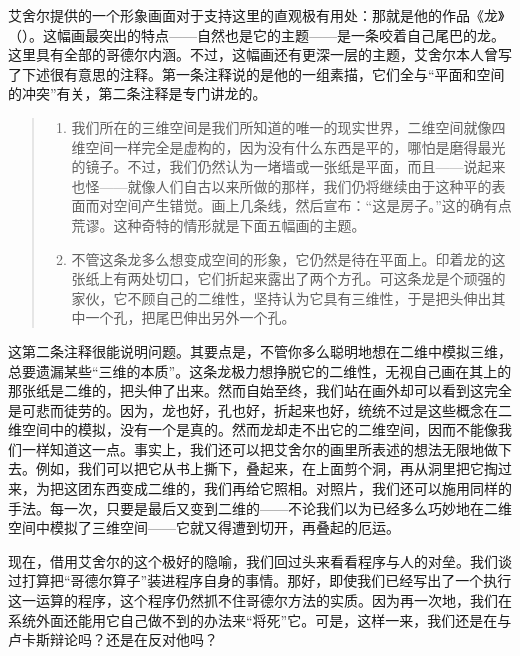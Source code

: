 艾舍尔提供的一个形象画面对于支持这里的直观极有用处：那就是他的作品《龙》（）。这幅画最突出的特点——自然也是它的主题——是一条咬着自己尾巴的龙。这里具有全部的哥德尔内涵。不过，这幅画还有更深一层的主题，艾舍尔本人曾写了下述很有意思的注释。第一条注释说的是他的一组素描，它们全与“平面和空间的冲突”有关，第二条注释是专门讲龙的。
\begin{quote}
\begin{enumerate}[wide,label=\Roman*.]
\item 我们所在的三维空间是我们所知道的唯一的现实世界，二维空间就像四维空间一样完全是虚构的，因为没有什么东西是平的，哪怕是磨得最光的镜子。不过，我们仍然认为一堵墙或一张纸是平面，而且——说起来也怪——就像人们自古以来所做的那样，我们仍将继续由于这种平的表面而对空间产生错觉。画上几条线，然后宣布：“这是房子。”这的确有点荒谬。这种奇特的情形就是下面五幅画的主题。

\item 不管这条龙多么想变成空间的形象，它仍然是待在平面上。印着龙的这张纸上有两处切口，它们折起来露出了两个方孔。可这条龙是个顽强的家伙，它不顾自己的二维性，坚持认为它具有三维性，于是把头伸出其中一个孔，把尾巴伸出另外一个孔。
\end{enumerate}
\end{quote}
这第二条注释很能说明问题。其要点是，不管你多么聪明地想在二维中模拟三维，总要遗漏某些“三维的本质”。这条龙极力想挣脱它的二维性，无视自己画在其上的那张纸是二维的，把头伸了出来。然而自始至终，我们站在画外却可以看到这完全是可悲而徒劳的。因为，龙也好，孔也好，折起来也好，统统不过是这些概念在二维空间中的模拟，没有一个是真的。然而龙却走不出它的二维空间，因而不能像我们一样知道这一点。事实上，我们还可以把艾舍尔的画里所表述的想法无限地做下去。例如，我们可以把它从书上撕下，叠起来，在上面剪个洞，再从洞里把它掏过来，为把这团东西变成二维的，我们再给它照相。对照片，我们还可以施用同样的手法。每一次，只要是最后又变到二维的——不论我们以为已经多么巧妙地在二维空间中模拟了三维空间——它就又得遭到切开，再叠起的厄运。

现在，借用艾舍尔的这个极好的隐喻，我们回过头来看看程序与人的对垒。我们谈过打算把“哥德尔算子”装进程序自身的事情。那好，即使我们已经写出了一个执行这一运算的程序，这个程序仍然抓不住哥德尔方法的实质。因为再一次地，我们在系统外面还能用它自己做不到的办法来“将死”它。可是，这样一来，我们还是在与卢卡斯辩论吗？还是在反对他吗？

